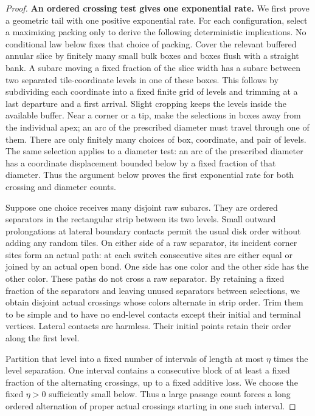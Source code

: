 \begin{proof}
\textbf{An ordered crossing test gives one exponential rate.}\quad
We first prove a geometric tail with one positive exponential rate.
For each configuration, select a maximizing packing only to derive the
following deterministic implications.  No conditional law below fixes
that choice of packing.
Cover the relevant buffered annular slice by finitely many small
bulk boxes and boxes flush with a straight bank.  A subarc moving a
fixed fraction of the slice width has a subarc between two separated
tile-coordinate levels in one of these boxes.  This follows by
subdividing each coordinate into a fixed finite grid of levels and
trimming at a last departure and a first arrival.  Slight cropping
keeps the levels inside the available buffer.  Near a corner or a
tip, make the selections in boxes away from the individual apex;
an arc of the prescribed diameter must travel through one of them.
There are only finitely many choices of box, coordinate, and pair
of levels. The same selection applies to a diameter test: an arc of
the prescribed diameter has a coordinate displacement bounded below
by a fixed fraction of that diameter. Thus the argument below proves
the first exponential rate for both crossing and diameter counts.

Suppose one choice receives many disjoint raw subarcs.  They are
ordered separators in the rectangular strip between its two levels.
Small outward prolongations at lateral boundary contacts permit the
usual disk order without adding any random tiles.  On either side
of a raw separator, its incident corner sites form an actual path:
at each switch consecutive sites are either equal or joined by an
actual open bond.  One side has one color and the other side has
the other color.  These paths do not cross a raw separator.
By retaining a fixed fraction of the separators and leaving unused
separators between selections, we obtain disjoint actual crossings
whose colors alternate in strip order.  Trim them to be simple and
to have no end-level contacts except their initial and terminal
vertices.  Lateral contacts are harmless.  Their initial points
retain their order along the first level.

Partition that level into a fixed number of intervals of length
at most \(\eta\) times the level separation.  One interval contains
a consecutive block of at least a fixed fraction of the alternating
crossings, up to a fixed additive loss.  We choose the fixed
\(\eta>0\) sufficiently small below.  Thus a large passage count
forces a long ordered alternation of proper actual crossings
starting in one such interval.


\end{proof}
